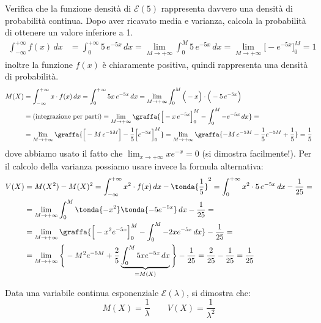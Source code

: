 \begin{esempio} Verifica che la funzione densità di \(\mathcal{E} (5)\) rappresenta davvero una densità di probabilità continua. Dopo aver ricavato media e varianza, calcola la probabilità di ottenere un valore inferiore a 1.
\[\begin{split}\int_{-\infty}^{+\infty} f(x) \, dx &= \int_0^{+\infty} 5\, e^{-5x} \,dx  = \lim_{M\rightarrow +\infty} \int_0^M 5 \, e^{-5x} \,dx =  \lim_{M \rightarrow +\infty} \Big[-e^{-5x}\Big]_0^M = 1\end{split} \]
inoltre la funzione \(f(x)\) è chiaramente positiva, quindi rappresenta una densità di probabilità.
\[\begin{split}M(X) &= \int_{-\infty}^{+\infty}x\cdot  f(x) \, dx =\int_{0}^{+\infty} 5x\, e^{-5x} \, dx =\lim_{M\rightarrow +\infty} \int_{0}^{M} \Big(-x\Big) \cdot \Big(-5\, e^{-5x}\Big) \\& = \text{(integrazione per parti)} = \lim_{M\rightarrow +\infty} \graffa{ \Big[-x \,e^{-5x}\Big]_0^M-\int_0^M -e^{-5x} \,dx} = \\
&=\lim_{M\rightarrow +\infty} \graffa{ \Big[-M \,e^{-5M}\Big]-\frac{1}{5}\Big[e^{-5x} \Big]_0^M} = \lim_{M\rightarrow +\infty} \graffa{-M \,e^{-5M}-\frac{1}{5} e^{-5M}+\frac{1}{5}} = \frac{1}{5} \end{split} \]
dove abbiamo usato il fatto che \(\displaystyle \lim_{x\rightarrow +\infty} x e^{-x} = 0\) \;(si dimostra facilmente!). Per il calcolo della varianza possiamo usare invece la formula alternativa:
\[\begin{split}V(X) &= M(X^2)-M(X)^2 = \int_{-\infty}^{+\infty}x^2 \cdot  f(x) \, dx - \tonda{ \frac{1}{5}}^2 = \int_{0}^{+\infty}x^2 \cdot  5\,e^{-5x} \, dx -  \frac{1}{25} = \\ &= 
\lim_{M\rightarrow +\infty} \int_0^M \tonda{-x^2} \tonda{-5 e^{-5x}}\,dx  -  \frac{1}{25} =\\&= \lim_{M\rightarrow +\infty}\graffa{ \Big[ -x^2 e^{-5x} \Big]_0^M - \int_0^M -2x e^{-5x} \,dx}  -  \frac{1}{25}= \\
&=   \lim_{M\rightarrow +\infty}\Bigg\{-M^2 e^{-5M} +\frac{2}{5} \underbrace{\int_0^M 5x e^{-5x} \,dx}_{=M(X)}\Bigg\}  -  \frac{1}{25}= \frac{2}{25}-\frac{1}{25} = \frac{1}{25}
 \end{split} \]
\end{esempio}


\begin{proprieta} Data una variabile continua esponenziale \(\mathcal{E}(\lambda)\), si dimostra che: 
\[\boxed{M(X) =\dfrac{1}{\lambda}} \qquad \boxed{V(X) = \dfrac{1}{\lambda^2}}\]
\end{proprieta}


